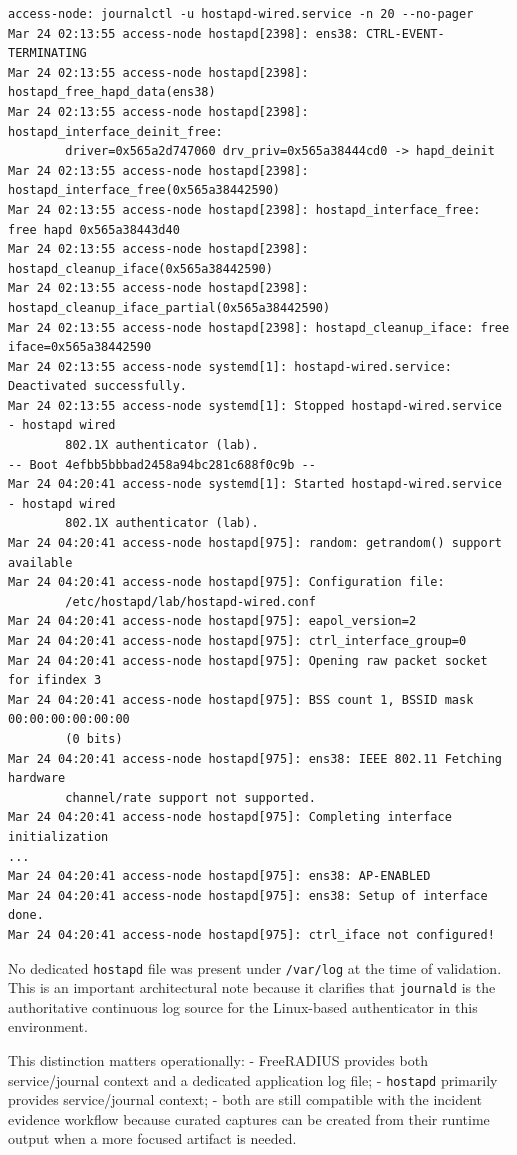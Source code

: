 \documentclass[11pt]{article}
\begin{document}
\begin{verbatim}
access-node: journalctl -u hostapd-wired.service -n 20 --no-pager
Mar 24 02:13:55 access-node hostapd[2398]: ens38: CTRL-EVENT-TERMINATING
Mar 24 02:13:55 access-node hostapd[2398]: hostapd_free_hapd_data(ens38)
Mar 24 02:13:55 access-node hostapd[2398]: hostapd_interface_deinit_free: 
        driver=0x565a2d747060 drv_priv=0x565a38444cd0 -> hapd_deinit
Mar 24 02:13:55 access-node hostapd[2398]: hostapd_interface_free(0x565a38442590)
Mar 24 02:13:55 access-node hostapd[2398]: hostapd_interface_free: free hapd 0x565a38443d40
Mar 24 02:13:55 access-node hostapd[2398]: hostapd_cleanup_iface(0x565a38442590)
Mar 24 02:13:55 access-node hostapd[2398]: hostapd_cleanup_iface_partial(0x565a38442590)
Mar 24 02:13:55 access-node hostapd[2398]: hostapd_cleanup_iface: free iface=0x565a38442590
Mar 24 02:13:55 access-node systemd[1]: hostapd-wired.service: Deactivated successfully.
Mar 24 02:13:55 access-node systemd[1]: Stopped hostapd-wired.service - hostapd wired 
        802.1X authenticator (lab).
-- Boot 4efbb5bbbad2458a94bc281c688f0c9b --
Mar 24 04:20:41 access-node systemd[1]: Started hostapd-wired.service - hostapd wired 
        802.1X authenticator (lab).
Mar 24 04:20:41 access-node hostapd[975]: random: getrandom() support available
Mar 24 04:20:41 access-node hostapd[975]: Configuration file: 
        /etc/hostapd/lab/hostapd-wired.conf
Mar 24 04:20:41 access-node hostapd[975]: eapol_version=2
Mar 24 04:20:41 access-node hostapd[975]: ctrl_interface_group=0
Mar 24 04:20:41 access-node hostapd[975]: Opening raw packet socket for ifindex 3
Mar 24 04:20:41 access-node hostapd[975]: BSS count 1, BSSID mask 00:00:00:00:00:00 
        (0 bits)
Mar 24 04:20:41 access-node hostapd[975]: ens38: IEEE 802.11 Fetching hardware 
        channel/rate support not supported.
Mar 24 04:20:41 access-node hostapd[975]: Completing interface initialization
...
Mar 24 04:20:41 access-node hostapd[975]: ens38: AP-ENABLED
Mar 24 04:20:41 access-node hostapd[975]: ens38: Setup of interface done.
Mar 24 04:20:41 access-node hostapd[975]: ctrl_iface not configured!
\end{verbatim}

No dedicated \texttt{hostapd} file was present under \texttt{/var/log} at the time of validation. This is an important architectural note because it clarifies that \texttt{journald} is the authoritative continuous log source for the Linux-based authenticator in this environment.

This distinction matters operationally:
- FreeRADIUS provides both service/journal context and a dedicated application log file;
- \texttt{hostapd} primarily provides service/journal context;
- both are still compatible with the incident evidence workflow because curated captures can be created from their runtime output when a more focused artifact is needed.
\end{document}

